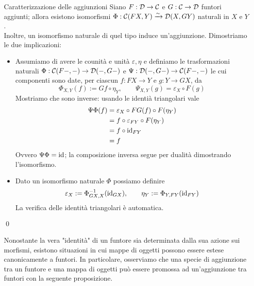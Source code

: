 \documentclass[openany]{book}
\renewcommand\C{\mc{C}}
\newcommand\D{\mc{D}}
\begin{document}
\begin{proposition}{Caratterizzazione delle aggiunzioni}{}
    Siano $F:\D\to\C$ e $G:\C\to\D$ funtori aggiunti; allora esistono isomorfismi $\Phi: \C(FX, Y)\iso \D(X, GY)$ naturali in $X$ e $Y$.\\
    Inoltre, un isomorfismo naturale di quel tipo induce un'aggiunzione.
    \proof 
    Dimostriamo le due implicazioni:\begin{itemize}
        \item Assumiamo di avere le counità e unità $\varepsilon, \eta$ e definiamo le trasformazioni naturali $\Phi: \C(F-, -)\to \D(-, G-)$ e $ \Psi: \D(-, G-) \to \C(F-, -)$ le cui componenti sono date, per ciascun $f: FX\to Y$ e $g : Y\to GX$, da
        \[ \Phi_{X,Y}(f) := Gf \circ \eta_Y , \qquad \Psi_{X,Y}(g) = \varepsilon_X\circ F(g)\]
        Mostriamo che sono inverse: usando le identià triangolari vale 
        \begin{align*}
            \Psi\Phi(f) & = \varepsilon_X \circ FG(f)\circ F(\eta_Y) \\
            & = f\circ \varepsilon_{FY} \circ F(\eta_Y) \\
            & = f\circ \operatorname{id}_{FY} \\
            & = f
        \end{align*}
        Ovvero $\Psi\Phi = \operatorname{id}$; la composizione inversa segue per dualità dimostrando l'isomorfismo.
        \item Dato un isomorfismo naturale $\Phi$ possiamo definire 
        \[ \varepsilon_X := \Phi_{GX, X}^{-1}(\operatorname{id}_{GX}), \qquad \eta_Y := \Phi_{Y, FY}(\operatorname{id}_{FY}) \]
        La verifica delle identità triangolari è automatica.
    \end{itemize}
    \qed
\end{proposition}

Nonostante la vera "identità" di un funtore sia determinata dalla sua azione sui morfismi, esistono situazioni in cui mappe di oggetti possono essere estese canonicamente a funtori. In particolare, osserviamo che una specie di aggiunzione tra un funtore e una mappa di oggetti può essere promossa ad un'aggiunzione tra funtori con la seguente proposizione.
\end{document}
